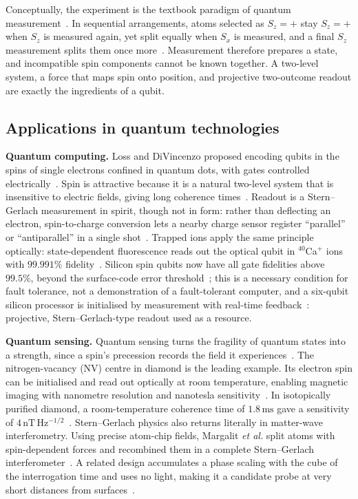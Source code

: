 \documentclass[12pt]{article}
\begin{document}
Conceptually, the experiment is the textbook paradigm of quantum measurement~\cite{sakurai2020}. In sequential arrangements, atoms selected as $S_z=+$ stay $S_z=+$ when $S_z$ is measured again, yet split equally when $S_x$ is measured, and a final $S_z$ measurement splits them once more~\cite{lecture6,sakurai2020}. Measurement therefore prepares a state, and incompatible spin components cannot be known together. A two-level system, a force that maps spin onto position, and projective two-outcome readout are exactly the ingredients of a qubit.

\subsection{Applications in quantum technologies}

\textbf{Quantum computing.} Loss and DiVincenzo proposed encoding qubits in the spins of single electrons confined in quantum dots, with gates controlled electrically~\cite{loss1998}. Spin is attractive because it is a natural two-level system that is insensitive to electric fields, giving long coherence times~\cite{burkard2023}. Readout is a Stern--Gerlach measurement in spirit, though not in form: rather than deflecting an electron, spin-to-charge conversion lets a nearby charge sensor register ``parallel'' or ``antiparallel'' in a single shot~\cite{elzerman2004}. Trapped ions apply the same principle optically: state-dependent fluorescence reads out the optical qubit in $^{40}$Ca$^+$ ions with $99.991\%$ fidelity~\cite{myerson2008}. Silicon spin qubits now have all gate fidelities above $99.5\%$, beyond the surface-code error threshold~\cite{xue2022}; this is a necessary condition for fault tolerance, not a demonstration of a fault-tolerant computer, and a six-qubit silicon processor is initialised by measurement with real-time feedback~\cite{philips2022}: projective, Stern--Gerlach-type readout used as a resource.

\textbf{Quantum sensing.} Quantum sensing turns the fragility of quantum states into a strength, since a spin's precession records the field it experiences~\cite{degen2017}. The nitrogen-vacancy (NV) centre in diamond is the leading example. Its electron spin can be initialised and read out optically at room temperature, enabling magnetic imaging with nanometre resolution and nanotesla sensitivity~\cite{rondin2014}. In isotopically purified diamond, a room-temperature coherence time of $1.8\,\mathrm{ms}$ gave a sensitivity of $4\,\mathrm{nT\,Hz^{-1/2}}$~\cite{balasubramanian2009}. Stern--Gerlach physics also returns literally in matter-wave interferometry. Using precise atom-chip fields, Margalit \emph{et al.} split atoms with spin-dependent forces and recombined them in a complete Stern--Gerlach interferometer~\cite{margalit2021}. A related design accumulates a phase scaling with the cube of the interrogation time and uses no light, making it a candidate probe at very short distances from surfaces~\cite{amit2019}.
\end{document}
